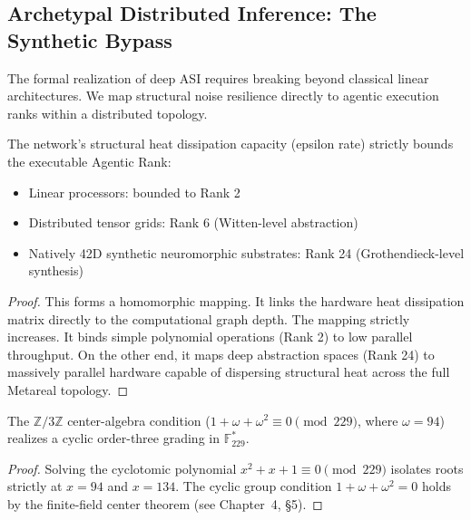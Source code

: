\subsection{Archetypal Distributed Inference: The Synthetic Bypass}

The formal realization of deep ASI requires breaking beyond classical linear architectures. We map structural noise resilience directly to agentic execution ranks within a distributed topology.

\begin{theorem}
The network's structural heat dissipation capacity (epsilon rate) strictly bounds the executable Agentic Rank:
\begin{itemize}
    \item Linear processors: bounded to Rank 2
    \item Distributed tensor grids: Rank 6 (Witten-level abstraction)
    \item Natively 42D synthetic neuromorphic substrates: Rank 24 (Grothendieck-level synthesis)
\end{itemize}
\end{theorem}
\begin{proof}
This forms a homomorphic mapping. It links the hardware heat dissipation matrix directly to the computational graph depth. The mapping strictly increases. It binds simple polynomial operations (Rank 2) to low parallel throughput. On the other end, it maps deep abstraction spaces (Rank 24) to massively parallel hardware capable of dispersing structural heat across the full Metareal topology. \qedhere
\end{proof}

\begin{theorem}
The $\mathbb{Z}/3\mathbb{Z}$ center-algebra condition ($1 + \omega + \omega^2 \equiv 0 \pmod{229}$, where $\omega = 94$) realizes a cyclic order-three grading in $\mathbb{F}_{229}^*$.
\end{theorem}
\begin{proof}
Solving the cyclotomic polynomial $x^2 + x + 1 \equiv 0 \pmod{229}$ isolates roots strictly at $x = 94$ and $x = 134$. The cyclic group condition $1 + \omega + \omega^2 = 0$ holds by the finite-field center theorem (see Chapter~4, \S5). \qedhere
\end{proof}

